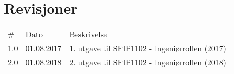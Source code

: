 \section*{Revisjoner}
\begin{tabular}{|l|l|l|}
\hline
\# & Dato & Beskrivelse \\ \hhline{|=|=|=|}
1.0 & 01.08.2017 & 1. utgave til SFIP1102 - Ingeniørrollen (2017) \\ \hline
2.0 & 01.08.2018 & 2. utgave til SFIP1102 - Ingeniørrollen (2018) \\ \hline
\end{tabular}